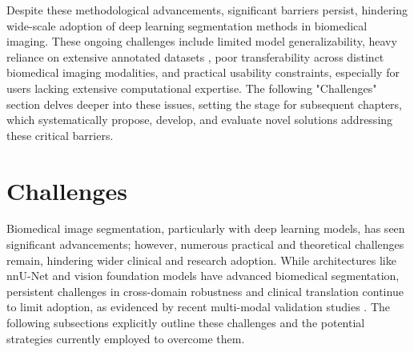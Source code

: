 \documentclass[./dissertation.tex]{subfiles}
\begin{document}





Despite these methodological advancements, significant barriers persist, hindering wide-scale adoption of deep learning segmentation methods in biomedical imaging. These ongoing challenges include limited model generalizability, heavy reliance on extensive annotated datasets \cite{wang2021annotation}, poor transferability across distinct biomedical imaging modalities, and practical usability constraints, especially for users lacking extensive computational expertise. The following "Challenges" section delves deeper into these issues, setting the stage for subsequent chapters, which systematically propose, develop, and evaluate novel solutions addressing these critical barriers.

\section{Challenges}
Biomedical image segmentation, particularly with deep learning models, has seen significant advancements; however, numerous practical and theoretical challenges remain, hindering wider clinical and research adoption. While architectures like nnU-Net \cite{isensee2021nnu} and vision foundation models have advanced biomedical segmentation, persistent challenges in cross-domain robustness and clinical translation continue to limit adoption, as evidenced by recent multi-modal validation studies \cite{isensee2024nnu}. The following subsections explicitly outline these challenges and the potential strategies currently employed to overcome them.
\end{document}
